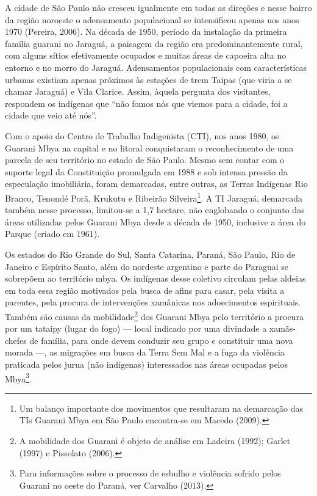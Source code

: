 A cidade de São Paulo não cresceu igualmente em todas as direções e
nesse bairro da região noroeste o adensamento populacional se
intensificou apenas nos anos 1970 (Pereira, 2006). Na década de 1950,
período da instalação da primeira família guarani no Jaraguá, a
paisagem da região era predominantemente rural, com alguns sítios
efetivamente ocupados e muitas áreas de capoeira alta no entorno e no
morro do Jaraguá. Adensamentos populacionais com características
urbanas existiam apenas próximos às estações de trem Taipas (que viria
a se chamar Jaraguá) e Vila Clarice. Assim, àquela pergunta dos
visitantes, respondem os indígenas que ``não fomos nós que viemos para a
cidade, foi a cidade que veio até nós''. 

Com o apoio do Centro de Trabalho Indigenista (CTI), nos anos 1980, os
Guarani Mbya na capital e no litoral conquistaram o reconhecimento de
uma parcela de seu território no estado de São Paulo. Mesmo sem contar
com o suporte legal da Constituição promulgada em 1988 e sob intensa
pressão da especulação imobiliária, foram demarcadas, entre outras, as
Terras Indígenas Rio Branco, Tenondé Porã, Krukutu e Ribeirão
Silveira\footnote{Um balanço importante dos movimentos que resultaram
na demarcação das TIs Guarani Mbya em São Paulo encontra-se em Macedo
(2009).}. A TI Jaraguá, demarcada também nesse processo, limitou-se a
1,7 hectare, não englobando o conjunto das áreas utilizadas pelos
Guarani Mbya desde a década de 1950, inclusive a área do Parque (criado
em 1961).

Os estados do Rio Grande do Sul, Santa Catarina, Paraná, São Paulo, Rio
de Janeiro e Espírito Santo, além do nordeste argentino e parte do
Paraguai se sobrepõem ao território mbya. Os indígenas desse coletivo
circulam pelas aldeias em toda essa região motivados pela busca de
afins para casar, pela visita a parentes, pela procura de intervenções
xamânicas nos adoecimentos espirituais. Também são causas da
mobilidade\footnote{A mobilidade dos Guarani é objeto de análise em
Ladeira (1992); Garlet (1997) e Pissolato (2006).} dos Guarani Mbya
pelo território a procura por um tataipy (lugar do fogo) — local
indicado por uma divindade a xamãs-chefes de família, para onde devem
conduzir seu grupo e constituir uma nova morada —, as migrações em
busca da Terra Sem Mal e a fuga da violência praticada pelos jurua (não
indígenas) interessados nas áreas ocupadas pelos Mbya\footnote{Para
informações sobre o processo de esbulho e violência sofrido pelos
Guarani no oeste do Paraná, ver Carvalho (2013).}.

